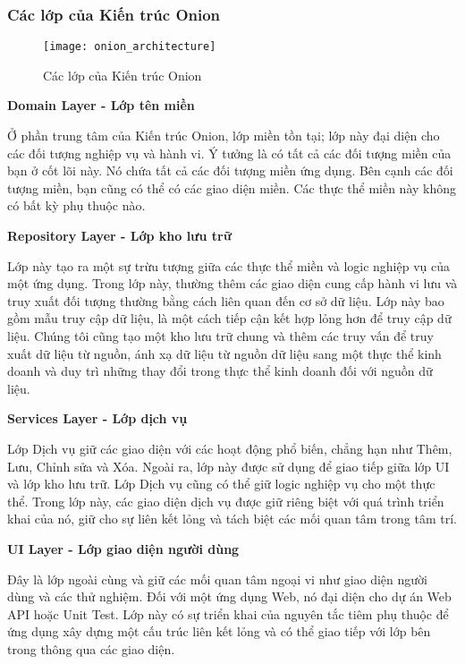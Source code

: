 \subsubsection{Các lớp của Kiến trúc Onion}

\begin{figure}[ht]
	\centering
	\texttt{[image: onion\_architecture]}
	\caption{Các lớp của Kiến trúc Onion}
\end{figure}

\textbf{Domain Layer - Lớp tên miền}

Ở phần trung tâm của Kiến trúc Onion, lớp miền tồn tại; lớp này đại diện cho các đối tượng nghiệp vụ và hành vi. Ý tưởng là có tất cả các đối tượng miền của bạn ở cốt lõi này. Nó chứa tất cả các đối tượng miền ứng dụng. Bên cạnh các đối tượng miền, bạn cũng có thể có các giao diện miền. Các thực thể miền này không có bất kỳ phụ thuộc nào.

\textbf{Repository Layer - Lớp kho lưu trữ}

Lớp này tạo ra một sự trừu tượng giữa các thực thể miền và logic nghiệp vụ của một ứng dụng. Trong lớp này, thường thêm các giao diện cung cấp hành vi lưu và truy xuất đối tượng thường bằng cách liên quan đến cơ sở dữ liệu. Lớp này bao gồm mẫu truy cập dữ liệu, là một cách tiếp cận kết hợp lỏng hơn để truy cập dữ liệu. Chúng tôi cũng tạo một kho lưu trữ chung và thêm các truy vấn để truy xuất dữ liệu từ nguồn, ánh xạ dữ liệu từ nguồn dữ liệu sang một thực thể kinh doanh và duy trì những thay đổi trong thực thể kinh doanh đối với nguồn dữ liệu.

\textbf{Services Layer - Lớp dịch vụ}

Lớp Dịch vụ giữ các giao diện với các hoạt động phổ biến, chẳng hạn như Thêm, Lưu, Chỉnh sửa và Xóa. Ngoài ra, lớp này được sử dụng để giao tiếp giữa lớp UI và lớp kho lưu trữ. Lớp Dịch vụ cũng có thể giữ logic nghiệp vụ cho một thực thể. Trong lớp này, các giao diện dịch vụ được giữ riêng biệt với quá trình triển khai của nó, giữ cho sự liên kết lỏng và tách biệt các mối quan tâm trong tâm trí.

\textbf{UI Layer - Lớp giao diện người dùng}

Đây là lớp ngoài cùng và giữ các mối quan tâm ngoại vi như giao diện người dùng và các thử nghiệm. Đối với một ứng dụng Web, nó đại diện cho dự án Web API hoặc Unit Test. Lớp này có sự triển khai của nguyên tắc tiêm phụ thuộc để ứng dụng xây dựng một cấu trúc liên kết lỏng và có thể giao tiếp với lớp bên trong thông qua các giao diện.

